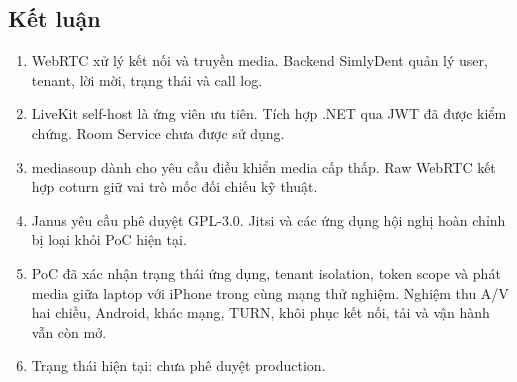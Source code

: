 \subsection{Kết luận}

\begin{enumerate}
  \item WebRTC xử lý kết nối và truyền media. Backend SimlyDent quản lý user, tenant,
  lời mời, trạng thái và call log.
  \item LiveKit self-host là ứng viên ưu tiên. Tích hợp .NET qua JWT đã được kiểm chứng.
  Room Service chưa được sử dụng.
  \item mediasoup dành cho yêu cầu điều khiển media cấp thấp. Raw WebRTC kết hợp coturn
  giữ vai trò mốc đối chiếu kỹ thuật.
  \item Janus yêu cầu phê duyệt GPL-3.0. Jitsi và các ứng dụng hội nghị hoàn chỉnh bị
  loại khỏi PoC hiện tại.
  \item PoC đã xác nhận trạng thái ứng dụng, tenant isolation, token scope và phát media
  giữa laptop với iPhone trong cùng mạng thử nghiệm. Nghiệm thu A/V hai chiều, Android,
  khác mạng, TURN, khôi phục kết nối, tải và vận hành vẫn còn mở.
  \item Trạng thái hiện tại: chưa phê duyệt production.
\end{enumerate}

\clearpage
